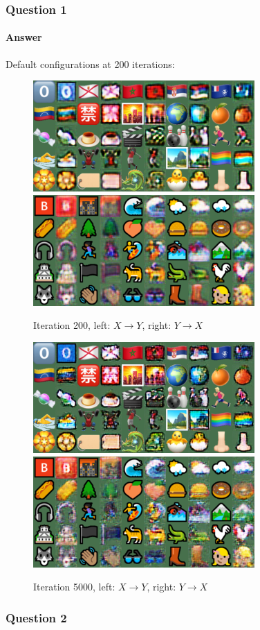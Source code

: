 \documentclass{article}
\begin{document}
	\subsubsection{Question 1}
	\paragraph{Answer} Default configurations at 200 iterations: 
	\begin{figure}[H]
		\centering
		\caption{Iteration 200, left: $X \to Y$, right: $Y \to X$}
		\includegraphics[width=0.45\linewidth]{./samples_cyclegan_Q1/sample-000200-X-Y.png}
		\includegraphics[width=0.45\linewidth]{./samples_cyclegan_Q1/sample-000200-Y-X.png}
	\end{figure}
	\begin{figure}[H]
		\centering
		\caption{Iteration 5000, left: $X \to Y$, right: $Y \to X$}
		\includegraphics[width=0.45\linewidth]{./samples_cyclegan_Q1/sample-005000-X-Y.png}
		\includegraphics[width=0.45\linewidth]{./samples_cyclegan_Q1/sample-005000-Y-X.png}
	\end{figure}

	\subsubsection{Question 2}
\end{document}
